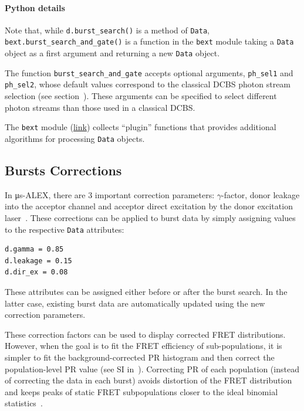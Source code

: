 \documentclass[10pt,letterpaper]{article}
\begin{document}
\paragraph*{Python details}
Note that, while \verb|d.burst_search()| is a method of \verb|Data|,
\verb|bext.burst_search_and_gate()| is a function in the \verb|bext| module
taking a \verb|Data| object as a first argument and returning a new
\verb|Data| object.

The function \verb|burst_search_and_gate| accepts optional arguments,
\verb|ph_sel1| and \verb|ph_sel2|, whose default values correspond to the
classical DCBS photon stream selection (see section~).
These arguments can be specified to select different photon streams than those used in
a classical DCBS.

The \verb|bext| module (\href{http://fretbursts.readthedocs.org/en/latest/plugins.html}{link})
collects ``plugin'' functions that provides additional algorithms
for processing \verb|Data| objects.

\subsection*{Bursts Corrections}
\label{sec:corrcoeff}

In μs-ALEX, there are 3 important correction parameters: $\gamma$-factor,
donor leakage into the acceptor channel
and acceptor direct excitation by the donor excitation laser~\cite{Lee_2005}.
These corrections can be applied to burst data by simply assigning values
to the respective \verb|Data| attributes:

\begin{lstlisting}
d.gamma = 0.85
d.leakage = 0.15
d.dir_ex = 0.08
\end{lstlisting}

These attributes can be assigned either before or after the burst search. In the
latter case, existing burst data are automatically updated using the new
correction parameters.

These correction factors can be used to display corrected FRET distributions.
However, when the goal is to fit the FRET efficiency of sub-populations,
it is simpler to fit the background-corrected
PR histogram and then correct the population-level PR value (see SI in~\cite{Lee_2005}).
Correcting PR of each population (instead of correcting the data in each burst)
avoids distortion of the FRET distribution and keeps peaks of
static FRET subpopulations closer to the ideal binomial statistics~\cite{Gopich_2007}.
\end{document}
